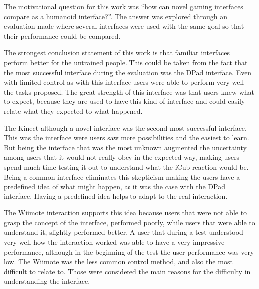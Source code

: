 
	The motivational question for this work was ``how can novel gaming interfaces compare as a humanoid interface?''. The answer was explored through an evaluation made where several interfaces were used with the same goal so that their performance could be compared.

	The strongest conclusion statement of this work is that familiar interfaces perform better for the untrained people. This could be taken from the fact that the most successful interface during the evaluation was the \ac{DPad} interface. Even with limited control as with this interface users were able to perform very well the tasks proposed. The great strength of this interface was that users knew what to expect, because they are used to have this kind of interface and could easily relate what they expected to what happened.
	
	The Kinect although a novel interface was the second most successful interface. This was the interface were users saw more possibilities and the easiest to learn. But being the interface that was the most unknown augmented the uncertainty among users that it would not really obey in the expected way, making users spend much time testing it out to understand what the iCub reaction would be. Being a common interface eliminates this skepticism making the users have a predefined idea of what might happen, as it was the case with the \ac{DPad} interface. Having a predefined idea helps to adapt to the real interaction.
	
	The \ac{Wiimote} interaction supports this idea because users that were not able to grasp the concept of the interface, performed poorly, while users that were able to understand it, slightly performed better. A user that during a test understood very well how the interaction worked was able to have a very impressive performance, although in the beginning of the test the user performance was very low. The \ac{Wiimote} was the less common control method, and also the most difficult to relate to. Those were considered the main reasons for the difficulty in understanding the interface.